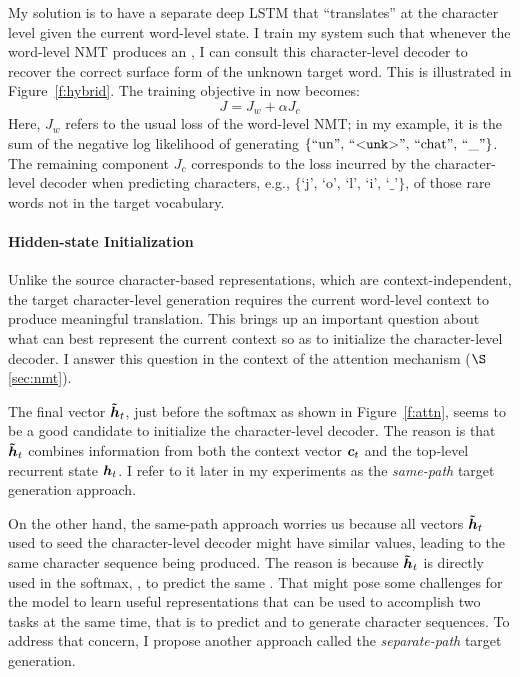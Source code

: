 My solution is to have a separate deep LSTM that ``translates'' at the
character level given the current word-level state. I train my system such
that whenever the word-level NMT
produces an \unk{}, I can consult this character-level decoder to recover the correct surface form of the
unknown target word. This is illustrated in Figure~\ref{f:hybrid}.
The training objective in  now becomes: %
\begin{equation}
J = J_{w} + \alpha J_{c}
\label{e:char_obj}
\end{equation}
Here, $J_{w}$ refers to the usual loss of the word-level NMT; in
my example, it is the sum of the negative log likelihood of
generating $\{\mbox{``un'', ``$<$\texttt{unk}$>${}'', ``chat'', ``\_''}\}$. The remaining component $J_c$
corresponds to the loss incurred by the character-level 
decoder when predicting characters, e.g., $\{\mbox{`j', `o', `l', `i',
`\_'}\}$, of those rare words not in the
target vocabulary. 


\paragraph{Hidden-state Initialization} %
\label{subsubsec:h}
Unlike the source character-based representations, which are
context-independent, the target character-level generation requires the
current word-level context to produce meaningful translation.
This brings up an important
question about what can best represent the current context so as to
initialize the character-level decoder. I answer this question in the context
of the attention mechanism ($\S$\ref{sec:nmt}). 

The final vector $\mbox{\boldmath{$\tilde{h}$}}_{t}$, just before the
softmax as shown in Figure~\ref{f:attn}, seems to be a good candidate to initialize the character-level decoder.
The reason is that $\mbox{\boldmath{$\tilde{h}$}}_{t}$ combines
information from both the context vector $\mbox{\boldmath{$c$}}_{t}$ and the top-level recurrent
state $\mbox{\boldmath{$h$}}_{t}$. I refer to it later in my
experiments as the \textit{same-path} target generation approach.

On the other hand, the same-path approach worries us because all vectors $\mbox{\boldmath{$\tilde{h}$}}_{t}$
used to seed the character-level decoder might have similar values, leading to
the same character sequence being produced.
The reason is because $\mbox{\boldmath{$\tilde{h}$}}_{t}$ is directly used in the softmax, , to predict the same \unk{}.
That might pose some challenges for the model to learn useful representations
that can be used to accomplish two tasks at the same time, that is to predict
\unk{} and to generate character sequences.
To address that concern, I propose another approach called
the \textit{separate-path} target generation.


